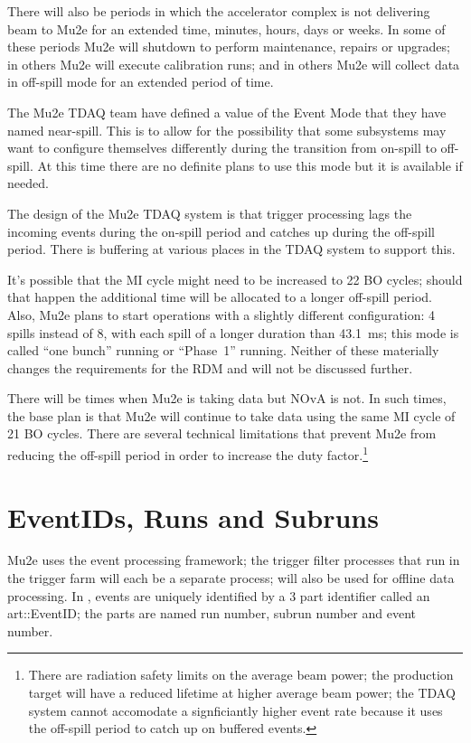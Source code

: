 There will also be periods in which the accelerator complex is not delivering
beam to Mu2e for an extended time, minutes, hours, days or weeks.
In some of these periods Mu2e will shutdown to perform maintenance, repairs or upgrades;
in others Mu2e will execute calibration runs;
and in others Mu2e will collect data in off-spill mode for an extended period of time.


The Mu2e TDAQ team have defined a value of the Event Mode that they have named near-spill.
This is to allow for the possibility that some subsystems may want to
configure themselves differently during the transition from on-spill to off-spill.
At this time there are no definite plans to use this mode but it is available if needed.

The design of the Mu2e TDAQ system is that trigger processing lags the incoming events
during the on-spill period and catches up during the off-spill period.  There is
buffering at various places in the TDAQ system to support this.

It's possible that the MI cycle might need to be increased to 22 BO cycles;
should that happen the additional time will be allocated to a longer off-spill period.
Also, Mu2e plans to start operations with a slightly different configuration:
4 spills instead of 8, with each spill of a longer duration than 43.1~ms;
this mode is called ``one bunch'' running or ``Phase~1'' running.
Neither of these materially changes the requirements for the RDM and
will not be discussed further.

There will be times when Mu2e is taking data but NOvA is not.
In such times, the base plan is that Mu2e will continue to take data using the same MI cycle of 21 BO cycles.
There are several technical limitations that prevent Mu2e from reducing the off-spill period
in order to increase the duty factor.\footnote{
There are radiation safety limits on the average beam power;
the production target will have a reduced lifetime at higher average beam power;
the TDAQ system cannot accomodate a signficiantly higher event rate because it
uses the off-spill period to catch up on buffered events.
}

\section{EventIDs, Runs and Subruns}
\label{sec:TagsIDsRunsSubRuns}


Mu2e uses the \art event processing framework;
the trigger filter processes that run in the trigger farm will each be a separate \art process;
\art will also be used for offline data processing.
In \art, events are uniquely identified by a 3 part identifier called an
{\code art::EventID}; the parts are named run number, subrun number
and event number.

